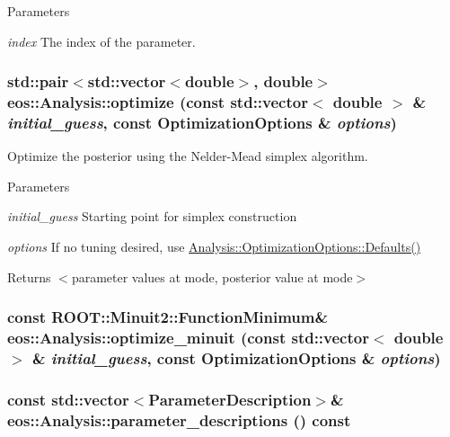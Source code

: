\begin{DoxyParams}{Parameters}
\item[{\em index}]The index of the parameter. \end{DoxyParams}
\hypertarget{classeos_1_1Analysis_ab558b84092479509d34d5f9ee0f03ad3}{
\subsubsection[{optimize}]{\setlength{\rightskip}{0pt plus 5cm}std::pair$<$std::vector$<$double$>$, double$>$ eos::Analysis::optimize (const std::vector$<$ double $>$ \& {\em initial\_\-guess}, \/  const {\bf OptimizationOptions} \& {\em options})}}
\label{classeos_1_1Analysis_ab558b84092479509d34d5f9ee0f03ad3}
Optimize the posterior using the Nelder-\/Mead simplex algorithm. 
\begin{DoxyParams}{Parameters}
\item[{\em initial\_\-guess}]Starting point for simplex construction \item[{\em options}]If no tuning desired, use \hyperlink{structeos_1_1Analysis_1_1OptimizationOptions_a809f9cf0f5d544c7303a631c278c3fa1}{Analysis::OptimizationOptions::Defaults()} \end{DoxyParams}
\begin{DoxyReturn}{Returns}
$<$parameter values at mode, posterior value at mode$>$ 
\end{DoxyReturn}
\hypertarget{classeos_1_1Analysis_a3f8c48eed78ea048627928613492eac5}{
\subsubsection[{optimize\_\-minuit}]{\setlength{\rightskip}{0pt plus 5cm}const ROOT::Minuit2::FunctionMinimum\& eos::Analysis::optimize\_\-minuit (const std::vector$<$ double $>$ \& {\em initial\_\-guess}, \/  const {\bf OptimizationOptions} \& {\em options})}}
\label{classeos_1_1Analysis_a3f8c48eed78ea048627928613492eac5}
\hypertarget{classeos_1_1Analysis_a8cc99f2ff2c99e2977c9dab68ff13c8b}{
\subsubsection[{parameter\_\-descriptions}]{\setlength{\rightskip}{0pt plus 5cm}const std::vector$<${\bf ParameterDescription}$>$\& eos::Analysis::parameter\_\-descriptions () const}}
\label{classeos_1_1Analysis_a8cc99f2ff2c99e2977c9dab68ff13c8b}



